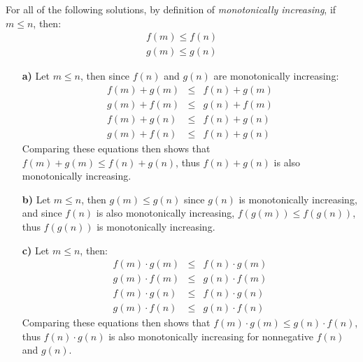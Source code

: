 For all of the following solutions, by definition of \textit{monotonically increasing}, if $m \leq n$, then:
\begin{eqnarray*}
	f(m) \leq f(n) \\
	g(m) \leq g(n)
\end{eqnarray*}

\begin{itemize}
\item[\textbf{a)}] Let $m \leq n$, then since $f(n)$ and $g(n)$ are monotonically increasing:
	\begin{eqnarray*}
		f(m) + g(m) & \leq & f(n) + g(m) \\
		g(m) + f(m) & \leq & g(n) + f(m) \\
		f(m) + g(n) & \leq & f(n) + g(n) \\
		g(m) + f(n) & \leq & f(n) + g(n)
	\end{eqnarray*}
	Comparing these equations then shows that $f(m) + g(m) \leq f(n) + g(n)$, thus $f(n) + g(n)$ is also monotonically increasing.
\item[\textbf{b)}] Let $m \leq n$, then $g(m) \leq g(n)$ since $g(n)$ is monotonically increasing, and since $f(n)$ is also monotonically increasing, $f(g(m)) \leq f(g(n))$, thus $f(g(n))$ is monotonically increasing.
\item[\textbf{c)}] Let $m \leq n$, then:
	\begin{eqnarray*}
		f(m) \cdot g(m) & \leq & f(n) \cdot g(m) \\
		g(m) \cdot f(m) & \leq & g(n) \cdot f(m) \\
		f(m) \cdot g(n) & \leq & f(n) \cdot g(n) \\
		g(m) \cdot f(n) & \leq & g(n) \cdot f(n)
	\end{eqnarray*}
	Comparing these equations then shows that $f(m) \cdot g(m) \leq g(n) \cdot f(n)$, thus $f(n) \cdot g(n)$ is also monotonically increasing for nonnegative $f(n)$ and $g(n)$.
\end{itemize}
